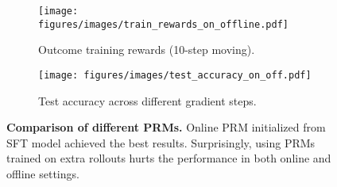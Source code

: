 \begin{figure*}[t]
    \centering
    \begin{subfigure}{0.42\textwidth}
        \centering
        \texttt{[image: figures/images/train\_rewards\_on\_offline.pdf]}
        \caption{Outcome training rewards (10-step moving).} %
        \label{fig:train_rewards_on_offline}
    \end{subfigure}
    \hfill %
    \begin{subfigure}{0.57\textwidth}
        \centering
        \texttt{[image: figures/images/test\_accuracy\_on\_off.pdf]}
        \caption{Test accuracy across different gradient steps.} %
        \label{fig:test_accuracy_on_off}
    \end{subfigure}
    \caption{\textbf{Comparison of different PRMs.} Online PRM initialized from SFT model achieved the best results. Surprisingly, using PRMs trained on extra rollouts
    hurts the performance in both online and offline settings. } %
    \label{fig:online_offline_prm}
\end{figure*}



